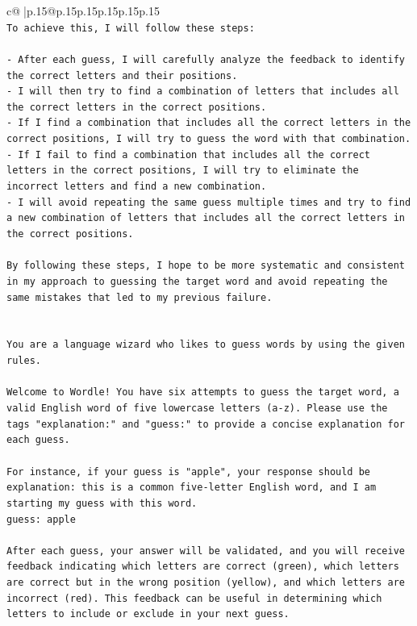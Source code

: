 \documentclass{article}
\begin{document}
{\begin{supertabular}{c@{$\;$}|p{.15\linewidth}@{}p{.15\linewidth}p{.15\linewidth}p{.15\linewidth}p{.15\linewidth}p{.15\linewidth}}
{{{\\ 
\texttt{To achieve this, I will follow these steps:} \\
\\ 
\texttt{{-} After each guess, I will carefully analyze the feedback to identify the correct letters and their positions.} \\
\texttt{{-} I will then try to find a combination of letters that includes all the correct letters in the correct positions.} \\
\texttt{{-} If I find a combination that includes all the correct letters in the correct positions, I will try to guess the word with that combination.} \\
\texttt{{-} If I fail to find a combination that includes all the correct letters in the correct positions, I will try to eliminate the incorrect letters and find a new combination.} \\
\texttt{{-} I will avoid repeating the same guess multiple times and try to find a new combination of letters that includes all the correct letters in the correct positions.} \\
\\ 
\texttt{By following these steps, I hope to be more systematic and consistent in my approach to guessing the target word and avoid repeating the same mistakes that led to my previous failure.} \\
\\ 
\\ 
\texttt{You are a language wizard who likes to guess words by using the given rules.} \\
\\ 
\texttt{Welcome to Wordle! You have six attempts to guess the target word, a valid English word of five lowercase letters (a{-}z). Please use the tags "explanation:" and "guess:" to provide a concise explanation for each guess.} \\
\\ 
\texttt{For instance, if your guess is "apple", your response should be} \\
\texttt{explanation: this is a common five{-}letter English word, and I am starting my guess with this word.} \\
\texttt{guess: apple} \\
\\ 
\texttt{After each guess, your answer will be validated, and you will receive feedback indicating which letters are correct (green), which letters are correct but in the wrong position (yellow), and which letters are incorrect (red). This feedback can be useful in determining which letters to include or exclude in your next guess.} \\
}}}
\end{supertabular}}
\end{document}
